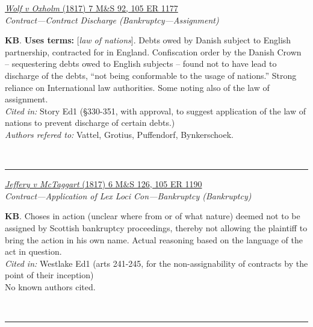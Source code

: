 \documentclass[twoside]{article}
\begin{document}
        \begin{small}
        \begin{center}
        \href{https://heinonline.org/HOL/P?h=hein.engrep/engrf0105&i=1181}{\textit{Wolf v Oxholm} (1817) 7 M\&S 92, 105 ER 1177} \label{40} \\ 
\textit{Contract---Contract Discharge (Bankruptcy---Assignment)}\\
        \end{center}
        \textbf{KB}.  \textbf{Uses terms: }[\textit{law of nations}]. Debts owed by Danish subject to English partnership, contracted for in England. Confiscation order by the Danish Crown – sequestering debts owed to English subjects – found not to have lead to discharge of the debts, “not being conformable to the usage of nations.” Strong reliance on International law authorities. Some noting also of the law of assignment.\\\textit{Cited in: }Story Ed1 (§330-351, with approval, to suggest application of the law of nations to prevent discharge of certain debts.)\\\textit{Authors refered to: }Vattel, Grotius, Puffendorf, Bynkerschoek.
        \end{small}\\
        \rule{\textwidth}{0.5pt}
        

        \begin{small}
        \begin{center}
        \href{https://heinonline.org/HOL/P?h=hein.engrep/engrf0105&i=1194}{\textit{Jeffery v McTaggart} (1817) 6 M\&S 126, 105 ER 1190} \label{45} \\ 
\textit{Contract---Application of Lex Loci Con---Bankruptcy (Bankruptcy)}\\
        \end{center}
        \textbf{KB}. Choses in action (unclear where from or of what nature) deemed not to be assigned by Scottish bankruptcy proceedings, thereby not allowing the plaintiff to bring the action in his own name. Actual reasoning based on the language of the act in question.\\\textit{Cited in: }Westlake Ed1 (arts 241-245, for the non-assignability of contracts by the point of their inception)\\No known authors cited.
        \end{small}\\
        \rule{\textwidth}{0.5pt}
        
\end{document}
